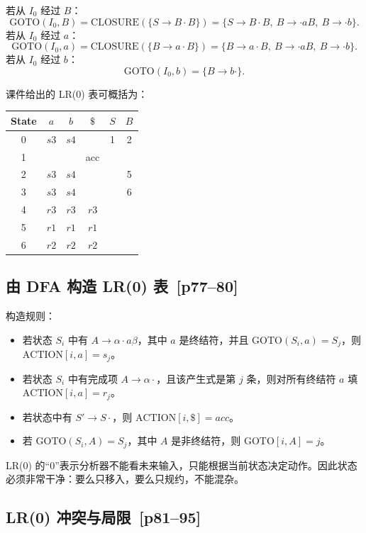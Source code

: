 \documentclass[UTF8,fontset=none,11pt]{ctexart}
\newcommand{\pg}[1]{\texorpdfstring{{\small\color{graytext}\,[p#1]}}{ [p#1]}}
\newcommand{\ACTION}{\ensuremath{\mathrm{ACTION}}}
\newcommand{\GOTO}{\ensuremath{\mathrm{GOTO}}}
\newcommand{\CLOSURE}{\ensuremath{\mathrm{CLOSURE}}}
\begin{document}
若从 \(I_0\) 经过 \(B\)：
\[
\GOTO(I_0,B)=\CLOSURE(\{S\to B\cdot B\})
=\{S\to B\cdot B,\ B\to\cdot aB,\ B\to\cdot b\}.
\]
若从 \(I_0\) 经过 \(a\)：
\[
\GOTO(I_0,a)=\CLOSURE(\{B\to a\cdot B\})
=\{B\to a\cdot B,\ B\to\cdot aB,\ B\to\cdot b\}.
\]
若从 \(I_0\) 经过 \(b\)：
\[
\GOTO(I_0,b)=\{B\to b\cdot\}.
\]

课件给出的 LR(0) 表可概括为：

\begin{center}
\small
\begin{tabular}{c|ccc|cc}
\toprule
State & \(a\) & \(b\) & \(\$\) & \(S\) & \(B\) \\
\midrule
0 & \(s3\) & \(s4\) &  & 1 & 2 \\
1 &  &  & acc &  &  \\
2 & \(s3\) & \(s4\) &  &  & 5 \\
3 & \(s3\) & \(s4\) &  &  & 6 \\
4 & \(r3\) & \(r3\) & \(r3\) &  &  \\
5 & \(r1\) & \(r1\) & \(r1\) &  &  \\
6 & \(r2\) & \(r2\) & \(r2\) &  &  \\
\bottomrule
\end{tabular}
\end{center}

\subsection{由 DFA 构造 LR(0) 表 \pg{77--80}}

构造规则：

\begin{itemize}
  \item 若状态 \(S_i\) 中有 \(A\to\alpha\cdot a\beta\)，其中 \(a\) 是终结符，并且 \(\GOTO(S_i,a)=S_j\)，则 \(\ACTION[i,a]=s_j\)。
  \item 若状态 \(S_i\) 中有完成项 \(A\to\alpha\cdot\)，且该产生式是第 \(j\) 条，则对所有终结符 \(a\) 填 \(\ACTION[i,a]=r_j\)。
  \item 若状态中有 \(S'\to S\cdot\)，则 \(\ACTION[i,\$]=acc\)。
  \item 若 \(\GOTO(S_i,A)=S_j\)，其中 \(A\) 是非终结符，则 \(\GOTO[i,A]=j\)。
\end{itemize}

LR(0) 的“0”表示分析器不能看未来输入，只能根据当前状态决定动作。因此状态必须非常干净：要么只移入，要么只规约，不能混杂。

\subsection{LR(0) 冲突与局限 \pg{81--95}}
\end{document}
